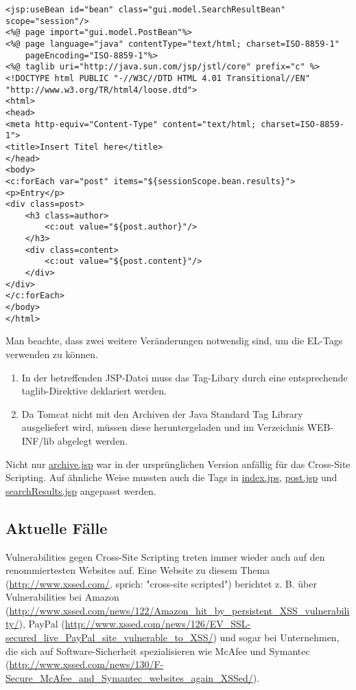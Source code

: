\begin{lstlisting}
<jsp:useBean id="bean" class="gui.model.SearchResultBean" scope="session"/>
<%@ page import="gui.model.PostBean"%>
<%@ page language="java" contentType="text/html; charset=ISO-8859-1"
    pageEncoding="ISO-8859-1"%>
<%@ taglib uri="http://java.sun.com/jsp/jstl/core" prefix="c" %>    
<!DOCTYPE html PUBLIC "-//W3C//DTD HTML 4.01 Transitional//EN" "http://www.w3.org/TR/html4/loose.dtd">
<html>
<head>
<meta http-equiv="Content-Type" content="text/html; charset=ISO-8859-1">
<title>Insert Titel here</title>
</head>
<body>
<c:forEach var="post" items="${sessionScope.bean.results}">
<p>Entry</p>
<div class=post>
	<h3 class=author>
		<c:out value="${post.author}"/>
	</h3>
	<div class=content>
		<c:out value="${post.content}"/>
	</div>
</div>
</c:forEach>
</body>
</html>
\end{lstlisting}

Man beachte, dass zwei weitere Veränderungen notwendig sind, um die EL-Tags verwenden zu können.
\begin{enumerate}
\item In der betreffenden JSP-Datei muss das Tag-Libary durch eine entsprechende taglib-Direktive deklariert werden. 
\item Da Tomcat nicht mit den Archiven der Java Standard Tag Library ausgeliefert wird, müssen diese heruntergeladen und im Verzeichnis WEB-INF/lib abgelegt werden.
\end{enumerate}

Nicht nur \url{archive.jsp} war in der ursprünglichen Version anfällig für das Cross-Site Scripting. Auf ähnliche Weise mussten auch die Tags in \url{index.jps}, \url{post.jsp} und \url{searchResults.jsp} angepasst werden.

\subsection{Aktuelle Fälle}

Vulnerabilities gegen Cross-Site Scripting treten immer wieder auch auf den renommiertesten Websites auf. Eine Website zu diesem Thema (\url{http://www.xssed.com/}, sprich: "cross-site scripted") berichtet z. B. über Vulnerabilities bei Amazon (\url{http://www.xssed.com/news/122/Amazon_hit_by_persistent_XSS_vulnerability/}), PayPal (\url{http://www.xssed.com/news/126/EV_SSL-secured_live_PayPal_site_vulnerable_to_XSS/}) und sogar bei Unternehmen, die sich auf Software-Sicherheit spezialisieren wie McAfee und Symantec (\url{http://www.xssed.com/news/130/F-Secure_McAfee_and_Symantec_websites_again_XSSed/}).

 
